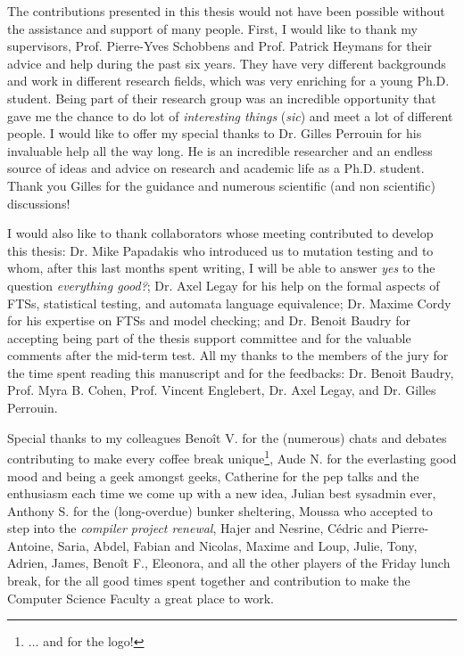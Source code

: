 
The contributions presented in this thesis would not have been possible without the assistance and support of many people. 
%
First, I would like to thank my supervisors, Prof. Pierre-Yves Schobbens and Prof. Patrick Heymans for their advice and help during the past six years. They have very different backgrounds and work in different research fields, which was very enriching for a young Ph.D. student. Being part of their research group was an incredible opportunity that gave me the chance to do lot of \textit{interesting things} (\textit{sic}) and meet a lot of different people. 
%
I would like to offer my special thanks to Dr. Gilles Perrouin for his invaluable help all the way long. He is an incredible researcher and an endless source of ideas and advice on research and academic life as a Ph.D. student. Thank you Gilles for the guidance and numerous scientific (and non scientific) discussions!

I would also like to thank collaborators whose meeting contributed to develop this thesis: Dr. Mike Papadakis who introduced us to mutation testing and to whom, after this last months spent writing, I will be able to answer \textit{yes} to the question \textit{everything good?}; Dr. Axel Legay for his help on the formal aspects of FTSs, statistical testing, and automata language equivalence; Dr. Maxime Cordy for his expertise on FTSs and model checking; and Dr. Benoit Baudry for accepting being part of the thesis support committee and for the valuable comments after the mid-term test. All my thanks to the members of the jury for the time spent reading this manuscript and for the feedbacks: Dr. Benoit Baudry, Prof. Myra B. Cohen, Prof. Vincent Englebert, Dr. Axel Legay, and Dr. Gilles Perrouin.

Special thanks to my colleagues Beno\^it V. for the (numerous) chats and debates contributing to make every coffee break unique\footnote{$\ldots$ and for the logo!}, Aude N. for the everlasting good mood and being a geek amongst geeks, Catherine for the pep talks and the enthusiasm each time we come up with a new idea, Julian \aka best sysadmin ever, Anthony S. for the (long-overdue) bunker sheltering, Moussa who accepted to step into the \textit{compiler project renewal}, Hajer and Nesrine, Cédric and Pierre-Antoine, Saria, Abdel, Fabian and Nicolas, Maxime and Loup, Julie, Tony, Adrien, James, Beno\^it F., Eleonora, and all the other players of the Friday lunch break, for the all good times spent together and contribution to make the Computer Science Faculty a great place to work. 

